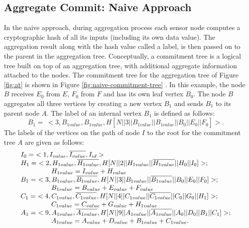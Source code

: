 	\subsection{Aggregate Commit: Naive Approach}
		\label{sub:aggregate_commit_naive_approach}
		In the naive approach, during aggregation process each sensor node computes a cryptographic hash of all its inputs (including its own data value).
		The aggregation result along with the hash value called a label, is then passed on to the parent in the aggregation tree.
		Conceptually, a commitment tree is a logical tree built on top of an aggregation tree, with additional aggregate information attached to the nodes. 
		The commitment tree for the aggregation tree of Figure \ref{fig:at} is  shown in Figure \ref{fig:naive-commitment-tree} .
		In this example, the node $B$ receives $E_{0}$ from $E$, $F_{0}$ from $F$ and has its own leaf vertex $B_{0}$.
		The node $B$ aggregates all three vertices by creating a new vertex $B_{1}$ and sends $B_{1}$ to its parent node $A$.
		The label of an internal vertex $B_{1}$ is defined as follows:
		\begin{equation*}
			B_{1} =\ <3, B_{1value}, \overline{B_{1value}}, H[N || 3 || B_{1value} || \overline{B_{1value}} ||B_{0}||E_{0}||F_{0}]>.
		\end{equation*}
		The labels of the vertices on the path of node $I$ to the root for the commitment tree $A$ are given as follows:
		\begin{equation*}
			\begin{array}{l}
				I_{0} =\ <1, I_{value}, \overline{I_{value}}, I_{id}>\\
				H_{1} =\ <2, H_{1value}, \overline{H_{1value}}, H [ N || 2 || H_{1value} || \overline{H_{1value}} || H_{0} || I_{0} ] > ;\\
				\textcolor{white}{XXXXX} H_{1value} = I_{value} + H_{value}\\
				B_{1} =\ <3, B_{1value}, \overline{B_{1value}}, H [ N || 3 || B_{1value} || \overline{B_{1value}} || B_{0} || E_{0} || F_{0} ] > ; \\ 
				\textcolor{white}{XXXXX} B_{1value} = B_{value} + E_{value} + F_{value} \\
				C_{1} =\ <4, C_{1value}, \overline{C_{1value}}, H [ N || 4 || C_{1value} || \overline{C_{1value}} || C_{0} || G_{0} || H_{1} ] >; \\
				\textcolor{white}{XXXXX} C_{1value} = C_{value} + G_{value} + H_{1value} \\
				A_{1} =\ <9, A_{1value}, \overline{A_{1value}}, H [ N || 9 || A_{1value} || \overline{A_{1value}} || A_{0} || D_{0} || B_{1} || C_{1} ] >;\\
				\textcolor{white}{XXXXX} A_{1value} = A_{value} + D_{value} + B_{1value} + C_{1value}.
			\end{array}
		\end{equation*}
